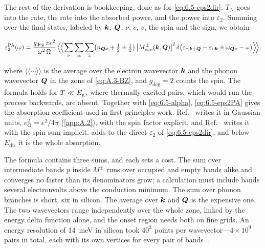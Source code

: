 The rest of the derivation is bookkeeping, done as for \cref{eq:6.5-eps2dir}: $T_{fi}$ goes into the rate, the rate into the absorbed power, and the power into $\varepsilon_2$. Summing over the final states, labeled by $\bm{k}$, $\bm{Q}$, $\nu$, $c$, $v$, the spin and the sign, we obtain
\begin{keyresult}
\begin{equation}
  \varepsilon_2^{\mathrm{PA}}(\omega) = \frac{g_{\mathrm{deg}}\,\pi e^2}{\omega^2\,\Omega}\,\Bigl\langle\!\Bigl\langle\sum_{\nu}\sum_{cv}\sum_\pm\bigl(n_{\bm{Q}\nu} + \tfrac12 \pm \tfrac12\bigr)\,\bigl|M^{\pm}_{cv\nu}(\bm{k},\bm{Q})\bigr|^2\,\delta\bigl(\varepsilon_{c,\bm{k}+\bm{Q}} - \varepsilon_{v\bm{k}} \pm \omega_{\bm{Q}\nu} - \omega\bigr)\Bigr\rangle\!\Bigr\rangle ,
  \label{eq:6.5-eps2PA}
\end{equation}
\end{keyresult}
where $\langle\!\langle\cdots\rangle\!\rangle$ is the average over the electron wavevector $\bm{k}$ and the phonon wavevector $\bm{Q}$ in the zone of \cref{eq:A.3-BZ}, and $g_{\mathrm{deg}} = 2$ counts the spin. The formula holds for $T \ll E_{\mathrm{g}}$, where thermally excited pairs, which would run the process backwards, are absent. Together with \cref{eq:6.5-alpha}, \cref{eq:6.5-eps2PA} gives the absorption coefficient used in first-principles work. Ref.~\cite[Eq.~(1)]{noffsinger2012phonon} writes it in Gaussian units, $e_{\mathrm{G}}^2 = e^2/4\pi$ (\cref{app:A.2}), with the spin factor explicit, and Ref.~\cite[Eq.~(200)]{giustino2017electron} writes it with the spin sum implicit.  adds to the direct $\varepsilon_2$ of \cref{eq:6.5-eps2dir}, and below $E_{\mathrm{dir}}$ it is the whole absorption.

The formula contains three sums, and each sets a cost. The sum over intermediate bands $p$ inside $M^\pm$ runs over occupied and empty bands alike and converges no faster than its denominators grow; a calculation must include bands several electronvolts above the conduction minimum. The sum over phonon branches is short, six in silicon. The average over $\bm{k}$ and $\bm{Q}$ is the expensive one. The two wavevectors range independently over the whole zone, linked by the energy delta function alone, and the onset region needs both on fine grids. An energy resolution of \SI{14}{meV} in silicon took $40^3$ points per wavevector---$4\times10^9$ pairs in total, each with its own vertices for every pair of bands~\cite{noffsinger2012phonon}.


